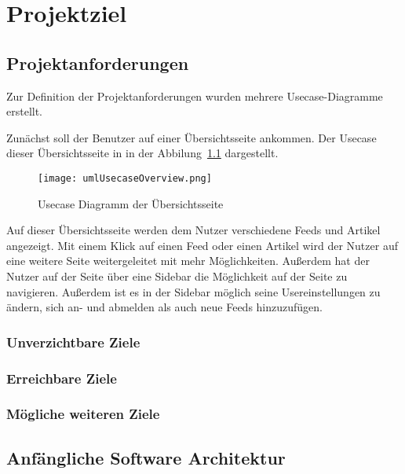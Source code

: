 
\chapter{Projektziel}

\section{Projektanforderungen}
Zur Definition der Projektanforderungen wurden mehrere Usecase-Diagramme erstellt.

Zunächst soll der Benutzer auf einer Übersichtsseite ankommen.
Der Usecase dieser Übersichtsseite in in der Abbilung~\ref{fig:usecaseOverview} dargestellt.
\begin{figure}
    \texttt{[image: umlUsecaseOverview.png]}
    \caption{Usecase Diagramm der Übersichtsseite}
    \label{fig:usecaseOverview}
\end{figure}
Auf dieser Übersichtsseite werden dem Nutzer verschiedene Feeds und Artikel angezeigt. Mit einem Klick auf einen Feed oder einen Artikel wird
der Nutzer auf eine weitere Seite weitergeleitet mit mehr Möglichkeiten. Außerdem hat der Nutzer auf der Seite über eine Sidebar die Möglichkeit
auf der Seite zu navigieren. Außerdem ist es in der Sidebar möglich seine Usereinstellungen zu ändern, sich an- und abmelden als auch neue Feeds
hinzuzufügen. 
\subsection{Unverzichtbare Ziele}

\subsection{Erreichbare Ziele}

\subsection{Mögliche weiteren Ziele}

\section{Anfängliche Software Architektur}
